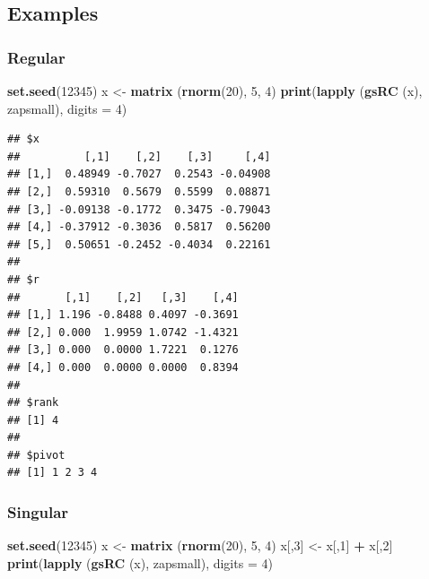 \documentclass[12pt,]{article}
\newenvironment{Shaded}{\begin{snugshade}}{\end{snugshade}}
\newcommand{\KeywordTok}[1]{\textcolor[rgb]{0.13,0.29,0.53}{\textbf{#1}}}
\newcommand{\DataTypeTok}[1]{\textcolor[rgb]{0.13,0.29,0.53}{#1}}
\newcommand{\DecValTok}[1]{\textcolor[rgb]{0.00,0.00,0.81}{#1}}
\newcommand{\StringTok}[1]{\textcolor[rgb]{0.31,0.60,0.02}{#1}}
\newcommand{\OperatorTok}[1]{\textcolor[rgb]{0.81,0.36,0.00}{\textbf{#1}}}
\newcommand{\NormalTok}[1]{#1}
\begin{document}
\subsection{Examples}\label{examples}

\subsubsection{Regular}\label{regular}

\begin{Shaded}
\begin{Highlighting}[]
\KeywordTok{set.seed}\NormalTok{(}\DecValTok{12345}\NormalTok{)}
\NormalTok{x <-}\StringTok{ }\KeywordTok{matrix}\NormalTok{ (}\KeywordTok{rnorm}\NormalTok{(}\DecValTok{20}\NormalTok{), }\DecValTok{5}\NormalTok{, }\DecValTok{4}\NormalTok{)}
\KeywordTok{print}\NormalTok{(}\KeywordTok{lapply}\NormalTok{ (}\KeywordTok{gsRC}\NormalTok{ (x), zapsmall), }\DataTypeTok{digits =} \DecValTok{4}\NormalTok{)}
\end{Highlighting}
\end{Shaded}

\begin{verbatim}
## $x
##          [,1]    [,2]    [,3]     [,4]
## [1,]  0.48949 -0.7027  0.2543 -0.04908
## [2,]  0.59310  0.5679  0.5599  0.08871
## [3,] -0.09138 -0.1772  0.3475 -0.79043
## [4,] -0.37912 -0.3036  0.5817  0.56200
## [5,]  0.50651 -0.2452 -0.4034  0.22161
## 
## $r
##       [,1]    [,2]   [,3]    [,4]
## [1,] 1.196 -0.8488 0.4097 -0.3691
## [2,] 0.000  1.9959 1.0742 -1.4321
## [3,] 0.000  0.0000 1.7221  0.1276
## [4,] 0.000  0.0000 0.0000  0.8394
## 
## $rank
## [1] 4
## 
## $pivot
## [1] 1 2 3 4
\end{verbatim}

\subsubsection{Singular}\label{singular}

\begin{Shaded}
\begin{Highlighting}[]
\KeywordTok{set.seed}\NormalTok{(}\DecValTok{12345}\NormalTok{)}
\NormalTok{x <-}\StringTok{ }\KeywordTok{matrix}\NormalTok{ (}\KeywordTok{rnorm}\NormalTok{(}\DecValTok{20}\NormalTok{), }\DecValTok{5}\NormalTok{, }\DecValTok{4}\NormalTok{)}
\NormalTok{x[,}\DecValTok{3}\NormalTok{] <-}\StringTok{ }\NormalTok{x[,}\DecValTok{1}\NormalTok{] }\OperatorTok{+}\StringTok{ }\NormalTok{x[,}\DecValTok{2}\NormalTok{]}
\KeywordTok{print}\NormalTok{(}\KeywordTok{lapply}\NormalTok{ (}\KeywordTok{gsRC}\NormalTok{ (x), zapsmall), }\DataTypeTok{digits =} \DecValTok{4}\NormalTok{)}
\end{Highlighting}
\end{Shaded}
\end{document}
